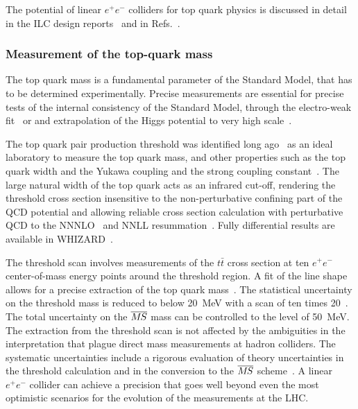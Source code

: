 The potential of linear $e^+e^-$ colliders for top quark physics is discussed in detail in the ILC design reports~\cite{}
and in Refs.~\cite{Agashe:2013hma,Vos:2016til,Abramowicz:2018rjq}.

\subsubsection{Measurement of the top-quark mass}
\label{subsubsec:highE:topmass}

The top quark mass is a fundamental parameter of the Standard Model, that has to be
determined experimentally. Precise measurements are essential for precise tests of
the internal consistency of the Standard Model, through the electro-weak
fit~\cite{Baak:2014ora} or and extrapolation of the Higgs potential to very high
scale~\cite{Degrassi:2012ry}.

The top quark pair production threshold was identified long ago~\cite{Gusken:1985nf} as
an ideal laboratory to measure the top quark mass, and other properties such as the top quark
width and the Yukawa coupling and the strong coupling constant~\cite{Strassler:1990nw}.
The large natural width of the top quark acts as an infrared cut-off,
rendering the threshold cross section insensitive to the non-perturbative confining part
of the QCD potential and allowing reliable cross section calculation with perturbative QCD
to the NNNLO~\cite{Beneke:2015kwa} and NNLL resummation~\cite{Hoang:2013uda}. Fully
differential results are available in WHIZARD~\cite{Bach:2017ggt}.

The threshold scan involves measurements of the $t\bar{t}$ cross section at ten $e^+e^-$
center-of-mass energy points around the threshold region. A fit of the line shape allows for
a precise extraction of the top quark mass~\cite{Martinez:2002st,Horiguchi:2013wra,Seidel:2013sqa}.
The statistical uncertainty on the threshold mass is reduced to below 20~MeV with a scan of
ten times 20~\ifb. The total uncertainty on the $\msb$ mass can be controlled to the level
of 50~MeV. The extraction from the threshold scan is not affected by the ambiguities in the
interpretation that plague direct mass measurements at hadron colliders. The systematic uncertainties
include a rigorous evaluation of theory uncertainties in the threshold calculation and in the conversion
to the $\msb$ scheme~\cite{Simon:2016pwp}. A linear $e^+e^-$ collider can achieve a precision that goes well beyond
even the most optimistic scenarios for the evolution of the measurements at the LHC.



